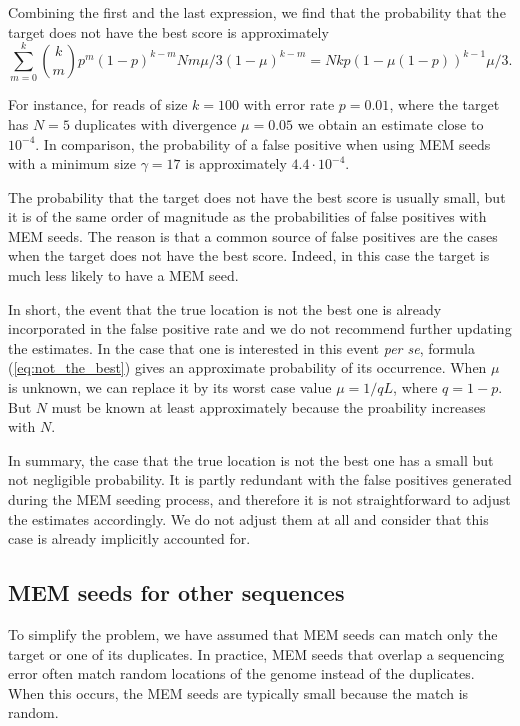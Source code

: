 \documentclass{article}
\begin{document}
Combining the first and the last expression, we find that the probability
that the target does not have the best score is approximately
\begin{equation}
\label{eq:not_the_best}
\sum_{m=0}^k {k \choose m}p^m(1-p)^{k-m} Nm\mu/3(1-\mu)^{k-m} = 
Nk p \left(1-\mu(1-p)\right)^{k-1}\mu/3.
\end{equation}

For instance, for reads of size $k=100$ with error rate $p=0.01$, where
the target has $N=5$ duplicates with divergence $\mu=0.05$ we obtain an
estimate close to $10^{-4}$. In comparison, the probability of a false
positive when using MEM seeds with a minimum size $\gamma=17$ is
approximately $4.4\cdot10^{-4}$.

The probability that the target does not have the best score is usually
small, but it is of the same order of magnitude as the probabilities of
false positives with MEM seeds. The reason is that a common source of
false positives are the cases when the target does not have the best
score. Indeed, in this case the target is much less likely to have a MEM
seed.

In short, the event that the true location is not the best one is already
incorporated in the false positive rate and we do not recommend further
updating the estimates. In the case that one is interested in this event
\textit{per se}, formula (\ref{eq:not_the_best}) gives an approximate
probability of its occurrence. When $\mu$ is unknown, we can replace it by
its worst case value $\mu = 1/qL$, where $q=1-p$. But $N$ must be known at
least approximately because the proability increases with $N$.

In summary, the case that the true location is not the best one has a
small but not negligible probability. It is partly redundant with the
false positives generated during the MEM seeding process, and therefore it
is not straightforward to adjust the estimates accordingly. We do not
adjust them at all and consider that this case is already implicitly
accounted for.

\subsection{MEM seeds for other sequences}
\label{sec:short_MEMs}

To simplify the problem, we have assumed that MEM seeds can match only the
target or one of its duplicates. In practice, MEM seeds that overlap a
sequencing error often match random locations of the genome instead of the
duplicates. When this occurs, the MEM seeds are typically small because 
the match is random.
\end{document}
